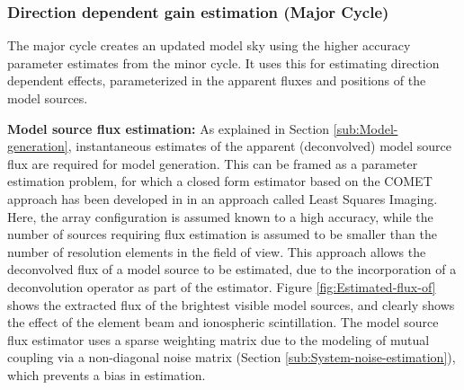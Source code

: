 \documentclass{aa}
\begin{document}
\subsubsection{\label{sub:Direction-dependent-gain}Direction dependent gain estimation (Major Cycle)}  

The major cycle  creates an updated  model sky using  the higher
accuracy parameter estimates  from the minor cycle. It  uses this for estimating
direction dependent effects, parameterized  in the apparent fluxes and positions
of the model sources.

\textbf{Model    source   flux    estimation:}   As    explained    in   Section
\ref{sub:Model-generation},    instantaneous   estimates    of    the   apparent
(deconvolved) model source flux are  required for model generation.  This can be
framed  as a parameter  estimation problem,  for which  a closed  form estimator
based     on     the     COMET     approach    has     been     developed     in
\citep{wijnholds2008fundamental}  in an approach  called Least  Squares Imaging.
Here, the  array configuration is  assumed known to  a high accuracy,  while the
number of  sources requiring flux estimation  is assumed to be  smaller than the
number of  resolution elements in the  field of view.  This  approach allows the
deconvolved flux of a model source  to be estimated, due to the incorporation of
a    deconvolution    operator   as    part    of    the   estimator.     Figure
\ref{fig:Estimated-flux-of} shows  the extracted  flux of the  brightest visible
model sources, and clearly shows the  effect of the element beam and ionospheric
scintillation.  The model  source flux estimator uses a  sparse weighting matrix
due to the modeling of mutual  coupling via a non-diagonal noise matrix (Section
\ref{sub:System-noise-estimation}), which prevents a bias in estimation.
\end{document}
